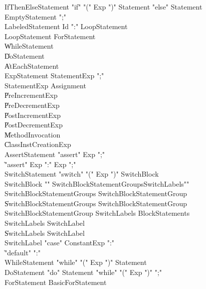 \begin{grammar}

 IfThenElseStatement  \:   \xcd"if"  \xcd"("  Exp  \xcd")"  Statement    \xcd"else"  Statement  \\
 EmptyStatement  \:   \xcd";"\\
 LabeledStatement  \:   Id  \xcd":"  LoopStatement\\
 LoopStatement  \:   ForStatement\\
    \|   WhileStatement\\
    \|   DoStatement\\
    \|   AtEachStatement\\
 ExpStatement  \:   StatementExp  \xcd";"\\
 StatementExp  \:   Assignment\\
    \|   PreIncrementExp\\
    \|   PreDecrementExp\\
    \|   PostIncrementExp\\
    \|   PostDecrementExp\\
    \|   MethodInvocation\\
    \|   ClassInstCreationExp\\
 AssertStatement  \:   \xcd"assert"  Exp  \xcd";"\\
    \|   \xcd"assert"  Exp    \xcd":"  Exp    \xcd";"\\
 SwitchStatement  \:   \xcd"switch"  \xcd"("  Exp  \xcd")"  SwitchBlock\\
 SwitchBlock  \:   \xcd"{"  SwitchBlockStatementGroups\opt  SwitchLabels\opt  \xcd"}"\\
 SwitchBlockStatementGroups  \:   SwitchBlockStatementGroup\\
    \|   SwitchBlockStatementGroups  SwitchBlockStatementGroup\\
 SwitchBlockStatementGroup  \:   SwitchLabels  BlockStatements\\
 SwitchLabels  \:   SwitchLabel\\
    \|   SwitchLabels  SwitchLabel\\
 SwitchLabel  \:   \xcd"case"  ConstantExp  \xcd":"\\
    \|   \xcd"default"  \xcd":"\\
 WhileStatement  \:   \xcd"while"  \xcd"("  Exp  \xcd")"  Statement\\
 DoStatement  \:   \xcd"do"  Statement  \xcd"while"  \xcd"("  Exp  \xcd")"  \xcd";"\\
 ForStatement  \:   BasicForStatement\\

\end{grammar}

